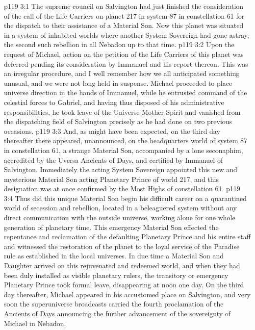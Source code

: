 \vs p119 3:1 The supreme council on Salvington had just finished the consideration of the call of the Life Carriers on planet 217 in system 87 in constellation 61 for the dispatch to their assistance of a Material Son. Now this planet was situated in a system of inhabited worlds where another System Sovereign had gone astray, the second such rebellion in all Nebadon up to that time.
\vs p119 3:2 Upon the request of Michael, action on the petition of the Life Carriers of this planet was deferred pending its consideration by Immanuel and his report thereon. This was an irregular procedure, and I well remember how we all anticipated something unusual, and we were not long held in suspense. Michael proceeded to place universe direction in the hands of Immanuel, while he entrusted command of the celestial forces to Gabriel, and having thus disposed of his administrative responsibilities, he took leave of the Universe Mother Spirit and vanished from the dispatching field of Salvington precisely as he had done on two previous occasions.
\vs p119 3:3 And, as might have been expected, on the third day thereafter there appeared, unannounced, on the headquarters world of system 87 in constellation 61, a strange Material Son, accompanied by a lone seconaphim, accredited by the Uversa Ancients of Days, and certified by Immanuel of Salvington. Immediately the acting System Sovereign appointed this new and mysterious Material Son acting Planetary Prince of world 217, and this designation was at once confirmed by the Most Highs of constellation 61.
\vs p119 3:4 Thus did this unique Material Son begin his difficult career on a quarantined world of secession and rebellion, located in a beleaguered system without any direct communication with the outside universe, working alone for one whole generation of planetary time. This emergency Material Son effected the repentance and reclamation of the defaulting Planetary Prince and his entire staff and witnessed the restoration of the planet to the loyal service of the Paradise rule as established in the local universes. In due time a Material Son and Daughter arrived on this rejuvenated and redeemed world, and when they had been duly installed as visible planetary rulers, the transitory or emergency Planetary Prince took formal leave, disappearing at noon one day. On the third day thereafter, Michael appeared in his accustomed place on Salvington, and very soon the superuniverse broadcasts carried the fourth proclamation of the Ancients of Days announcing the further advancement of the sovereignty of Michael in Nebadon.
